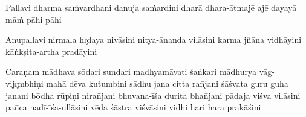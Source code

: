 Pallavi 
dharma sa\.{m}vardhani danuja sa\.{m}ardini 
dhar\=a dhara-\=atmaj\={e} aj\={e} dayay\=a m\=a\.{m} p\=ahi p\=ahi 

Anupallavi 
nirmala hr̥daya niv\=asini nitya-\=ananda vil\=asini 
karma j\~{n}\=ana vidh\=ayini k\=aṅk\d{s}ita-artha prad\=ayini 

Cara\d{n}am 
m\=adhava s\={o}dari sundari madhyam\=avati \'{s}aṅkari 
m\=adhurya v\=ag-vijr̥mbhi\d{n}i mah\=a d\={e}va ku\.{t}umbini 
s\=adhu jana citta ran̄jani \'{s}\=a\'{s}vata guru guha janani 
b\={o}dha r\={u}pi\d{n}i niran̄jani bhuvana-\={i}\'{s}a durita bhan̄jani 
p\=adaja vi\'{s}va vil\=asini pan̄ca nad\={i}-\={i}\'{s}a-ull\=asini 
v\={e}da \'{s}\=astra vi\'{s}v\=asini vidhi hari hara prak\=a\'{s}ini
